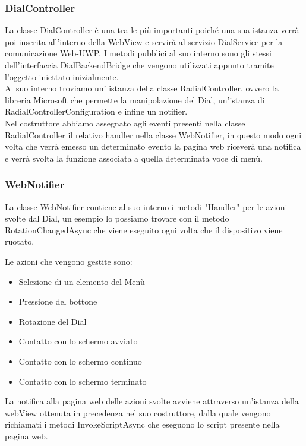 \subsubsection{DialController}

La classe DialController è una tra le più importanti poiché una sua istanza verrà poi inserita all’interno della WebView e servirà al servizio DialService per la comunicazione Web-UWP. I metodi pubblici al suo interno sono gli stessi dell’interfaccia DialBackendBridge che vengono utilizzati appunto tramite l’oggetto iniettato inizialmente.\\

Al suo interno troviamo un’ istanza della classe RadialController\cite{rad}, ovvero la libreria Microsoft che permette la manipolazione del Dial, un'istanza di RadialControllerConfiguration e infine un notifier.\\

Nel costruttore abbiamo assegnato agli eventi presenti nella classe RadialController il relativo handler nella classe WebNotifier, in questo modo ogni volta che verrà emesso un determinato evento la pagina web riceverà una notifica e verrà svolta la funzione associata a quella determinata voce di menù.

\subsubsection{WebNotifier}

La classe WebNotifier contiene al suo interno i metodi "Handler" per le azioni svolte dal Dial, un esempio lo possiamo trovare con il metodo RotationChangedAsync che viene eseguito ogni volta che il dispositivo viene ruotato.
 
Le azioni che vengono gestite sono:
\begin{itemize}
\item Selezione di un elemento del Menù
\item Pressione del bottone
\item Rotazione del Dial
\item Contatto con lo schermo avviato
\item Contatto con lo schermo continuo
\item Contatto con lo schermo terminato
\end{itemize}
La notifica alla pagina web delle azioni svolte avviene attraverso un'istanza della webView ottenuta in precedenza nel suo costruttore, dalla quale vengono richiamati i metodi InvokeScriptAsync che eseguono lo script presente nella pagina web.

